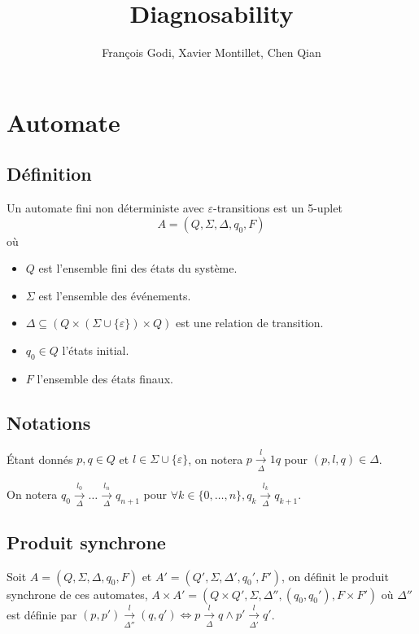 \documentclass[10pt,a4paper]{article}
\begin{document}
    \title{Diagnosability}

    \author{François Godi, Xavier Montillet, Chen Qian}

\section{Automate}

\subsection{D\'efinition}

Un automate fini non déterministe avec  $\varepsilon$-transitions est un 5-uplet
$$A = (Q, \Sigma, \Delta, q_0, F)$$
o\`u
\begin{itemize}
	\item $Q$ est l'ensemble fini des états du système.
	\item $\Sigma$ est l'ensemble des événements.
	\item $\Delta \subseteq (Q \times (\Sigma \cup \{\varepsilon\}) \times Q)$ est une relation de transition.
	\item $q_0 \in Q$ l'états initial.
	\item $F$ l'ensemble des \'etats finaux.
\end{itemize}

\subsection{Notations}
\'Etant donn\'es $p,q \in Q$ et $l\in \Sigma \cup \{\varepsilon\}$, on notera $p \overset{l}{\underset{\Delta}{\to}}1 q$ pour $(p,l,q) \in \Delta$.

On notera $q_0 \overset{l_0}{\underset{\Delta}{\to}} \dots \overset{l_n}{\underset{\Delta}{\to}} q_{n+1}$ pour $\forall k \in \{0,\dots,n\}, q_k \overset{l_k}{\underset{\Delta}{\to}} q_{k+1}$.

\subsection{Produit synchrone}

Soit $A = (Q, \Sigma, \Delta, q_0, F)$ et $A' = (Q', \Sigma, \Delta', q_0', F')$, on définit le produit synchrone de ces automates, $A\times A' = (Q \times Q', \Sigma, \Delta'', (q_0, q_0'), F\times F')$ o\`u $\Delta''$ est d\'efinie par $(p,p')\overset{l}{\underset{\Delta''}{\to}}(q,q') \iff p\overset{l}{\underset{\Delta}{\to}}q \land p'\overset{l}{\underset{\Delta'}{\to}}q'$.
\end{document}
